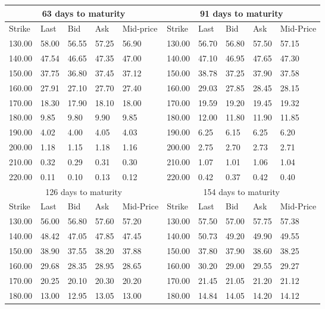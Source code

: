 \documentclass[12pt]{report}
\begin{document}
\begin{appendices}
\begin{table}[ht]
\centering
\begin{tabular}{|lllll|lllll|}
  \hline
  \multicolumn{5}{|c|}{63 days to maturity} & \multicolumn{5}{c|}{91 days to maturity} \\
  \hline
  Strike & Last & Bid & Ask & Mid-price & Strike & Last & Bid & Ask & Mid-Price \\
  \hline
  130.00 & 58.00 & 56.55 & 57.25 & 56.90 &   130.00 & 56.70 & 56.80 & 57.50 & 57.15 \\ 
  140.00 & 47.54 & 46.65 & 47.35 & 47.00 &  140.00 & 47.10 & 46.95 & 47.65 & 47.30 \\ 
  150.00 & 37.75 & 36.80 & 37.45 & 37.12 &  150.00 & 38.78 & 37.25 & 37.90 & 37.58 \\ 
  160.00 & 27.91 & 27.10 & 27.70 & 27.40 &  160.00 & 29.03 & 27.85 & 28.45 & 28.15 \\ 
  170.00 & 18.30 & 17.90 & 18.10 & 18.00 &  170.00 & 19.59 & 19.20 & 19.45 & 19.32 \\ 
  180.00 & 9.85 & 9.80 & 9.90 & 9.85 &  180.00 & 12.00 & 11.80 & 11.90 & 11.85 \\ 
  190.00 & 4.02 & 4.00 & 4.05 & 4.03 &  190.00 & 6.25 & 6.15 & 6.25 & 6.20 \\ 
  200.00 & 1.18 & 1.15 & 1.18 & 1.16 &  200.00 & 2.75 & 2.70 & 2.73 & 2.71 \\ 
  210.00 & 0.32 & 0.29 & 0.31 & 0.30 &  210.00 & 1.07 & 1.01 & 1.06 & 1.04 \\ 
  220.00 & 0.11 & 0.10 & 0.13 & 0.12 &  220.00 & 0.42 & 0.37 & 0.42 & 0.40 \\
  \hline
  \multicolumn{5}{|c|}{126 days to maturity} & \multicolumn{5}{c|}{154 days to maturity} \\
    \hline
  Strike & Last & Bid & Ask & Mid-Price & Strike & Last & Bid & Ask & Mid-Price \\
  \hline
  130.00 & 56.00 & 56.80 & 57.60 & 57.20 &  130.00 & 57.50 & 57.00 & 57.75 & 57.38 \\ 
  140.00 & 48.42 & 47.05 & 47.85 & 47.45 &  140.00 & 50.73 & 49.20 & 49.90 & 49.55 \\ 
  150.00 & 38.90 & 37.55 & 38.20 & 37.88 &  150.00 & 37.80 & 37.90 & 38.60 & 38.25 \\ 
  160.00 & 29.68 & 28.35 & 28.95 & 28.65 &  160.00 & 30.20 & 29.00 & 29.55 & 29.27 \\ 
  170.00 & 20.25 & 20.10 & 20.30 & 20.20 &  170.00 & 21.45 & 21.05 & 21.20 & 21.12 \\ 
  180.00 & 13.00 & 12.95 & 13.05 & 13.00 &  180.00 & 14.84 & 14.05 & 14.20 & 14.12 \\ 

\end{tabular}
\end{table}
\end{appendices}
\end{document}
